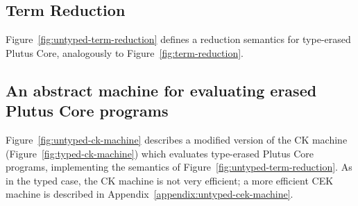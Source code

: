\documentclass[a4paper]{article}
\begin{document}
\subsection{Term Reduction}
\label{sec:untyped-term-reduction}
Figure~\ref{fig:untyped-term-reduction} defines a reduction semantics
for type-erased Plutus Core, analogously to
Figure~\ref{fig:term-reduction}.



\subsection{An abstract machine for evaluating erased Plutus Core programs}
\label{sec:untyped-ck-machine}
Figure~\ref{fig:untyped-ck-machine} describes a modified version of
the CK machine (Figure~\ref{fig:typed-ck-machine}) which evaluates
type-erased Plutus Core programs, implementing the semantics of
Figure~\ref{fig:untyped-term-reduction}. As in the typed case, the CK
machine is not very efficient; a more efficient CEK machine is
described in Appendix~\ref{appendix:untyped-cek-machine}.




\end{document}
